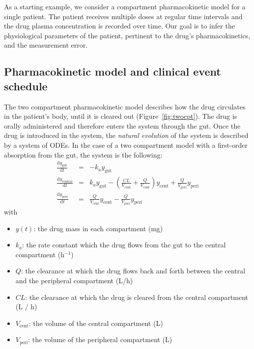 
As a starting example, we consider a compartment pharmacokinetic model for a single patient.
The patient receives multiple doses at regular time intervals and the drug plasma concentration is recorded over time.
Our goal is to infer the physiological parameters of the patient, pertinent to the drug's pharmacokinetics, and the measurement error.

\subsection{Pharmacokinetic model and clinical event schedule} 

The two compartment pharmacokinetic model describes how the drug circulates in the patient's body, until it is cleared out (Figure~\ref{fig:twocpt}).
The drug is orally administered and therefore enters the system through the gut.
Once the drug is introduced in the system, the \textit{natural evolution} of the system is described by a system of ODEs.
In the case of a two compartment model with a first-order absorption from the gut, the system is the following:
%
\begin{eqnarray*}
  \frac{\mathrm d y_\mathrm{gut}}{\mathrm d t} & = & - k_a y_\mathrm{gut} \\ 
  \frac{\mathrm d y_\mathrm{central}}{\mathrm d t} & = & k_a y_\mathrm{gut} - \left (\frac{CL}{V_\mathrm{cent}} + \frac{Q}{V_\mathrm{cent}} \right) y_\mathrm{cent} + \frac{Q}{V_\mathrm{peri}} y_\mathrm{peri} \\
  \frac{\mathrm d y_\mathrm{peri}}{\mathrm d t} & = & \frac{Q}{V_\mathrm{cent}} y_\mathrm{cent} - \frac{Q}{V_\mathrm{peri}} y_\mathrm{peri}
\end{eqnarray*}
%
with
\begin{itemize}
  \setlength\itemsep{0em}
  \item $y(t)$: the drug mass in each compartment (mg)
  \item $k_a$: the rate constant which the drug flows from the gut to the central compartment (h$^{-1}$)
  \item $Q$: the clearance at which the drug flows back and forth between the central and the peripheral compartment (L/h)
  \item $CL$: the clearance at which the drug is cleared from the central compartment (L / h)
  \item $V_\mathrm{cent}$: the volume of the central compartment (L)
  \item $V_\mathrm{peri}$: the volume of the peripheral compartment (L)
\end{itemize}

